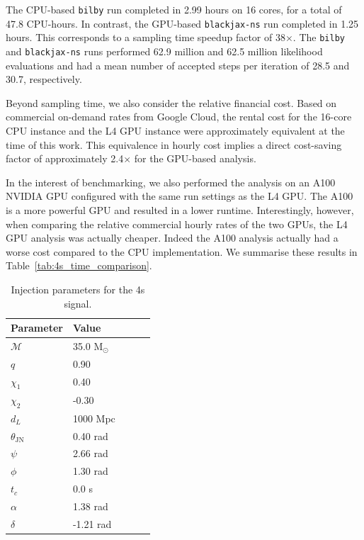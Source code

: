 \documentclass[fleqn,usenatbib]{mnras}
\begin{document}
The CPU-based \texttt{bilby} run completed in 2.99 hours on 16 cores, for a total of
47.8 CPU-hours. In contrast, the GPU-based \texttt{blackjax-ns} run
completed in 1.25 hours. This corresponds to a sampling time speedup factor
of 38$\times$. The \texttt{bilby} and \texttt{blackjax-ns} runs performed
62.9 million and 62.5 million likelihood evaluations and had a
mean number of accepted steps per iteration of 28.5 and 30.7, respectively.

Beyond sampling time, we also consider the relative financial cost. Based
on commercial on-demand rates from Google Cloud, the rental cost for the 16-core
CPU instance and the L4 GPU instance were approximately equivalent at
the time of this work. This equivalence in hourly cost implies a direct
cost-saving factor of approximately 2.4$\times$ for the GPU-based analysis.

In the interest of benchmarking, we also performed the analysis on 
an A100 NVIDIA GPU configured with the same run settings as the L4 GPU.
The A100 is a more powerful GPU and resulted in a lower runtime. Interestingly,
however, when comparing the relative commercial hourly rates of the two GPUs,
the L4 GPU analysis was actually cheaper. Indeed the A100 analysis actually had a 
worse cost compared to the CPU implementation. We summarise these results in 
Table~\ref{tab:4s_time_comparison}.

\begin{table}
    \centering
    \caption{Injection parameters for the 4s signal.}
    \label{tab:injection_params}
    \begin{tabular}{l l l c c}
    \hline
    \hline
    \textbf{Parameter} & \textbf{Value} \\
    \hline
    $\mathcal{M}$ & 35.0 M$_{\odot}$ \\
    $q$ & 0.90 \\
    $\chi_1$ & 0.40 \\
    $\chi_2$ & -0.30 \\
    $d_L$ & 1000 Mpc \\
    $\theta_{\textrm{JN}}$ & 0.40 rad \\
    $\psi$ & 2.66 rad \\
    $\phi$ & 1.30 rad \\
    $t_c$ & 0.0 s\\
    $\alpha$ & 1.38 rad \\
    $\delta$ & -1.21 rad \\
    \hline
    \hline
    \end{tabular}
    \end{table}
\end{document}
